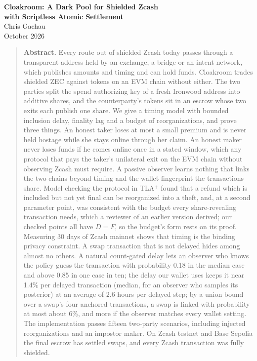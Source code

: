 \documentclass[10pt,letterpaper]{article}
\theoremstyle{plain}
\theoremstyle{definition}
\begin{document}
\begin{center}
{\Large\bfseries Cloakroom: A Dark Pool for Shielded Zcash\\[0.2em] with Scriptless Atomic Settlement}\\[1.1em]
{\normalsize Chris Gachau}\\[0.25em]
{\small October 2026}
\end{center}

\vspace{0.3em}
\begin{quote}
\small
\textbf{Abstract.} Every route out of shielded Zcash today passes through a transparent address
held by an exchange, a bridge or an intent network, which publishes amounts and timing and can
hold funds. Cloakroom trades shielded ZEC against tokens on an EVM chain without either. The two
parties split the spend authorizing key of a fresh Ironwood address into additive shares, and
the counterparty's tokens sit in an escrow whose two exits each publish one share. We give a
timing model with bounded inclusion delay, finality lag and a budget of reorganizations, and
prove three things. An honest taker loses at most a small premium and is never held hostage while she stays online
through her claim. An honest maker
never loses funds if he comes online once in a stated window, which any protocol that pays the
taker's unilateral exit on the EVM chain without observing Zcash must require. A passive observer learns nothing that links the two chains beyond timing and the wallet
fingerprint the transactions share. Model checking the protocol in TLA$^+$ found that a refund
which is included but not yet final can be reorganized into a theft, and, at a second parameter
point, was consistent with the budget every share-revealing transaction needs, which a reviewer of an
earlier version derived; our checked points all have $D=F$, so the budget's form rests on its proof. Measuring 30 days of Zcash mainnet shows that timing is the
binding privacy constraint. A swap transaction that is not delayed hides among almost no others.
A natural count-gated delay lets an observer who knows the policy guess the transaction with
probability 0.18 in the median case and above 0.85 in one case in ten; the delay our wallet
uses keeps it near 1.4\% per delayed transaction (median, for an observer who samples its
posterior) at an average of 2.6 hours per delayed step; by a union bound over a swap's four
anchored transactions, a swap is linked with probability at most about 6\%, and more if the
observer matches every wallet setting.
The implementation passes fifteen two-party scenarios, including injected reorganizations and
an impostor maker. On Zcash testnet and Base Sepolia the final escrow has settled swaps, and every
Zcash transaction was fully shielded.
\end{quote}
\end{document}
